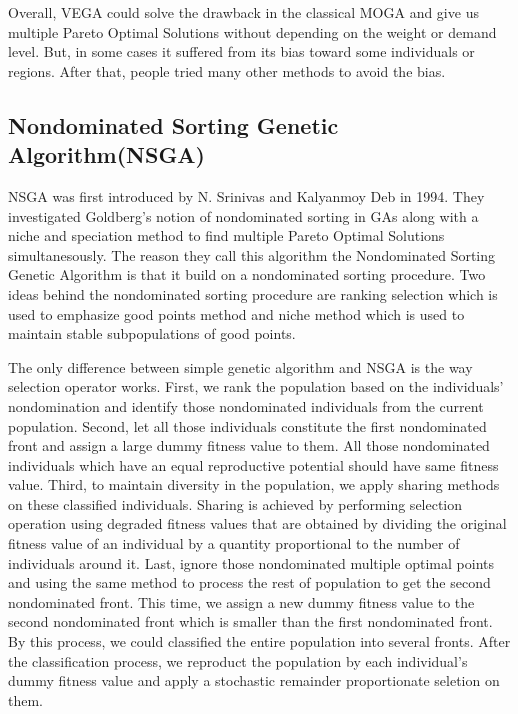 Overall, VEGA could solve the drawback in the classical MOGA and give us multiple Pareto Optimal Solutions without depending on the weight or demand level. But, in some cases it suffered from its bias toward some individuals or regions. After that, people tried many other methods to avoid the bias.

\subsection{Nondominated Sorting Genetic Algorithm(NSGA)}
NSGA was first introduced by N. Srinivas and Kalyanmoy Deb in 1994\cite{NSGA_1994}. They investigated Goldberg's notion of nondominated sorting in GAs along with a niche and speciation method to find multiple Pareto Optimal Solutions simultanesously. The reason they call this algorithm the Nondominated Sorting Genetic Algorithm is that it build on a nondominated sorting procedure. Two ideas behind the nondominated sorting procedure are ranking selection which is used to emphasize good points method and niche method which is used to maintain stable subpopulations of good points.

The only difference between simple genetic algorithm and NSGA is the way selection operator works. First, we rank the population based on the individuals' nondomination and identify those nondominated individuals from the current population. Second, let all those individuals constitute the first nondominated front and assign a large dummy fitness value to them. All those nondominated individuals which have an equal reproductive potential should have same fitness value. Third, to maintain diversity in the population, we apply sharing methods\cite{Deb_1989_Investigation}\cite{Deb_1989_Genetic} on these classified individuals. Sharing is achieved by performing selection operation using degraded fitness values that are obtained by dividing the original fitness value of an individual by a quantity proportional to the number of individuals around it. Last, ignore those nondominated multiple optimal points and using the same method to process the rest of population to get the second nondominated front. This time, we assign a new dummy fitness value to the second nondominated front which is smaller than the first nondominated front. By this process, we could classified the entire population into several fronts. After the classification process, we reproduct the population by each individual's dummy fitness value and apply a stochastic remainder proportionate seletion on them.

